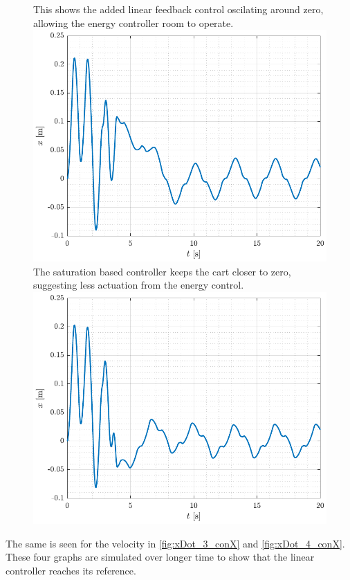\begin{figure}[H]
  \hspace{-10pt}
  \captionbox
  {
    This shows the added linear feedback control oscilating around zero, allowing the energy controller room to operate.
    \label{fig:x_3_conX}
  }
  {
    \hspace{-1cm}
    \includegraphics[width=.4\textwidth]{figures/x_3_conX}
  }
  \hspace{20pt}
  \captionbox 
  {
    The saturation based controller keeps the cart closer to zero, suggesting less actuation from the energy control.
    \label{fig:x_4_conX}
  }
  {
    \hspace{-1cm}
    \includegraphics[width=.4\textwidth]{figures/x_4_conX}
  }  
\end{figure}
The same is seen for the velocity in \autoref{fig:xDot_3_conX} and \ref{fig:xDot_4_conX}. These four graphs are simulated over longer time to show that the linear controller reaches its reference.
